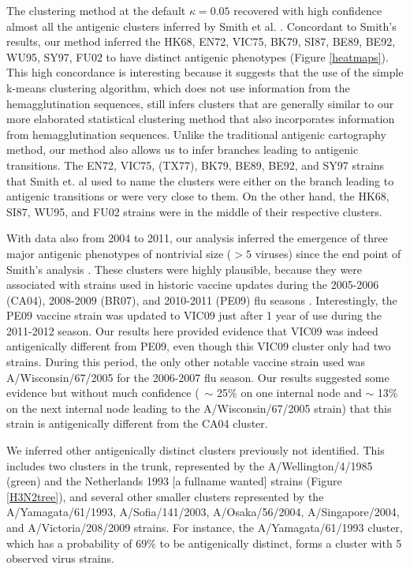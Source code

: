 \documentclass[11pt,oneside,letterpaper]{article}
\begin{document}
The clustering method at the default $\kappa=0.05$ recovered with high confidence almost all the  antigenic clusters inferred by Smith et al. \cite{smith_mapping_2004}. 
Concordant to Smith's results, our method inferred the HK68, EN72, VIC75, BK79, SI87, BE89, BE92, WU95, SY97, FU02 to have distinct antigenic phenotypes (Figure \ref{heatmaps}). %
This high concordance is interesting because it suggests that the use of the simple k-means clustering algorithm, which does not use information from the hemagglutination sequences, still infers clusters that are generally similar to our more elaborated statistical clustering method that also incorporates information from hemagglutination sequences.  %
Unlike the traditional antigenic cartography method, our method also allows us to infer branches leading to antigenic transitions.
The EN72, VIC75, (TX77), BK79, BE89, BE92, and SY97 strains that Smith et. al used to name the clusters were either on the branch leading to antigenic transitions or were very close to them.
On the other hand, the HK68, SI87, WU95, and FU02 strains were in the middle of their respective clusters. 


With data also from 2004 to 2011, our analysis inferred the emergence of three major antigenic phenotypes of nontrivial size ($>5$ viruses) since the end point of Smith's analysis \cite{smith_mapping_2004}.  
These clusters were highly plausible, because they were associated with strains used in historic vaccine updates during the 2005-2006 (CA04), 2008-2009 (BR07), and 2010-2011 (PE09) flu seasons \cite{WHO VACCINE REPORT}. 
Interestingly, the PE09 vaccine strain was updated to VIC09 just after 1 year of use during the 2011-2012 season. 
Our results here provided evidence that VIC09 was indeed antigenically different from PE09, even though this VIC09 cluster only had two strains.
During this period, the only other notable vaccine strain used was A/Wisconsin/67/2005 for the 2006-2007 flu season.
Our results suggested some evidence but without much confidence (~$\sim$ 25\% on one internal node and $\sim$ 13\% on the next internal node leading to the A/Wisconsin/67/2005 strain) that this strain is antigenically different from the CA04 cluster.

We inferred other antigenically distinct clusters previously not identified. %
This includes two clusters in the trunk, represented by the A/Wellington/4/1985 (green) and the Netherlands 1993 [a fullname wanted] strains (Figure \ref{H3N2tree}), and several other smaller clusters represented by the A/Yamagata/61/1993, A/Sofia/141/2003, A/Osaka/56/2004,  A/Singapore/2004, and A/Victoria/208/2009 strains. 
For instance, the A/Yamagata/61/1993 cluster, which has a probability of 69\% to be antigenically distinct, forms a cluster with 5 observed virus strains. 
\end{document}
